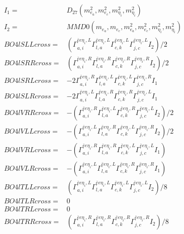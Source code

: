 \documentclass[A4,landscape]{article}
\begin{document}
\begin{align} 
I_1 = & D_{27}(m^2_{e_{{a}}}, m^2_{e_{{c}}}, m^2_{\eta_i}, m^2_{\eta_i}) \\ 
I_2 = & MMD0(m_{e_{{a}}}, m_{e_{{c}}}, m^2_{e_{{a}}}, m^2_{e_{{c}}}, m^2_{\eta_i}, m^2_{\eta_i}) \\ 
  BO4lSLLcross= & ( \Gamma^{\bar{e}e \eta_i ,L}_{a, i} \Gamma^{\bar{e}e \eta_i ,L}_{l, a} \Gamma^{\bar{e}e \eta_i ,L}_{c, k} \Gamma^{\bar{e}e \eta_i ,L}_{j, c} I_2)/2 \\ 
  BO4lSRRcross= & ( \Gamma^{\bar{e}e \eta_i ,R}_{a, i} \Gamma^{\bar{e}e \eta_i ,R}_{l, a} \Gamma^{\bar{e}e \eta_i ,R}_{c, k} \Gamma^{\bar{e}e \eta_i ,R}_{j, c} I_2)/2 \\ 
  BO4lSRLcross= & -2  \Gamma^{\bar{e}e \eta_i ,R}_{a, i} \Gamma^{\bar{e}e \eta_i ,L}_{l, a} \Gamma^{\bar{e}e \eta_i ,L}_{c, k} \Gamma^{\bar{e}e \eta_i ,R}_{j, c} I_1 \\ 
  BO4lSLRcross= & -2  \Gamma^{\bar{e}e \eta_i ,L}_{a, i} \Gamma^{\bar{e}e \eta_i ,R}_{l, a} \Gamma^{\bar{e}e \eta_i ,R}_{c, k} \Gamma^{\bar{e}e \eta_i ,L}_{j, c} I_1 \\ 
  BO4lVRRcross= & -( \Gamma^{\bar{e}e \eta_i ,R}_{a, i} \Gamma^{\bar{e}e \eta_i ,L}_{l, a} \Gamma^{\bar{e}e \eta_i ,R}_{c, k} \Gamma^{\bar{e}e \eta_i ,L}_{j, c} I_2)/2 \\ 
  BO4lVLLcross= & -( \Gamma^{\bar{e}e \eta_i ,L}_{a, i} \Gamma^{\bar{e}e \eta_i ,R}_{l, a} \Gamma^{\bar{e}e \eta_i ,L}_{c, k} \Gamma^{\bar{e}e \eta_i ,R}_{j, c} I_2)/2 \\ 
  BO4lVRLcross= & -( \Gamma^{\bar{e}e \eta_i ,R}_{a, i} \Gamma^{\bar{e}e \eta_i ,R}_{l, a} \Gamma^{\bar{e}e \eta_i ,L}_{c, k} \Gamma^{\bar{e}e \eta_i ,L}_{j, c} I_1) \\ 
  BO4lVLRcross= & -( \Gamma^{\bar{e}e \eta_i ,L}_{a, i} \Gamma^{\bar{e}e \eta_i ,L}_{l, a} \Gamma^{\bar{e}e \eta_i ,R}_{c, k} \Gamma^{\bar{e}e \eta_i ,R}_{j, c} I_1) \\ 
  BO4lTLLcross= & ( \Gamma^{\bar{e}e \eta_i ,L}_{a, i} \Gamma^{\bar{e}e \eta_i ,L}_{l, a} \Gamma^{\bar{e}e \eta_i ,L}_{c, k} \Gamma^{\bar{e}e \eta_i ,L}_{j, c} I_2)/8 \\ 
  BO4lTLRcross= & 0 \\ 
  BO4lTRLcross= & 0 \\ 
  BO4lTRRcross= & ( \Gamma^{\bar{e}e \eta_i ,R}_{a, i} \Gamma^{\bar{e}e \eta_i ,R}_{l, a} \Gamma^{\bar{e}e \eta_i ,R}_{c, k} \Gamma^{\bar{e}e \eta_i ,R}_{j, c} I_2)/8 \\ 
\end{align} 
\end{document}
